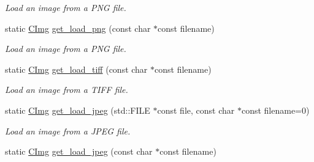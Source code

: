 \begin{DoxyCompactItemize}
\begin{DoxyCompactList}\small\item\em Load an image from a P\-N\-G file. \end{DoxyCompactList}\item 
\hypertarget{structcimg__library_1_1_c_img_a77fa8c53e85449f0eb7b923b515ad914}{static \hyperlink{structcimg__library_1_1_c_img}{C\-Img} \hyperlink{structcimg__library_1_1_c_img_a77fa8c53e85449f0eb7b923b515ad914}{get\-\_\-load\-\_\-png} (const char $\ast$const filename)}\label{structcimg__library_1_1_c_img_a77fa8c53e85449f0eb7b923b515ad914}

\begin{DoxyCompactList}\small\item\em Load an image from a P\-N\-G file. \end{DoxyCompactList}\item 
\hypertarget{structcimg__library_1_1_c_img_a672230867b55f5db7205f7ecaa72200b}{static \hyperlink{structcimg__library_1_1_c_img}{C\-Img} \hyperlink{structcimg__library_1_1_c_img_a672230867b55f5db7205f7ecaa72200b}{get\-\_\-load\-\_\-tiff} (const char $\ast$const filename)}\label{structcimg__library_1_1_c_img_a672230867b55f5db7205f7ecaa72200b}

\begin{DoxyCompactList}\small\item\em Load an image from a T\-I\-F\-F file. \end{DoxyCompactList}\item 
\hypertarget{structcimg__library_1_1_c_img_a4582de9e3170ce981f33124eb3e5a93b}{static \hyperlink{structcimg__library_1_1_c_img}{C\-Img} \hyperlink{structcimg__library_1_1_c_img_a4582de9e3170ce981f33124eb3e5a93b}{get\-\_\-load\-\_\-jpeg} (std\-::\-F\-I\-L\-E $\ast$const file, const char $\ast$const filename=0)}\label{structcimg__library_1_1_c_img_a4582de9e3170ce981f33124eb3e5a93b}

\begin{DoxyCompactList}\small\item\em Load an image from a J\-P\-E\-G file. \end{DoxyCompactList}\item 
\hypertarget{structcimg__library_1_1_c_img_a0face6e46c3e4d1fdb26865f743504eb}{static \hyperlink{structcimg__library_1_1_c_img}{C\-Img} \hyperlink{structcimg__library_1_1_c_img_a0face6e46c3e4d1fdb26865f743504eb}{get\-\_\-load\-\_\-jpeg} (const char $\ast$const filename)}\label{structcimg__library_1_1_c_img_a0face6e46c3e4d1fdb26865f743504eb}


\end{DoxyCompactItemize}
